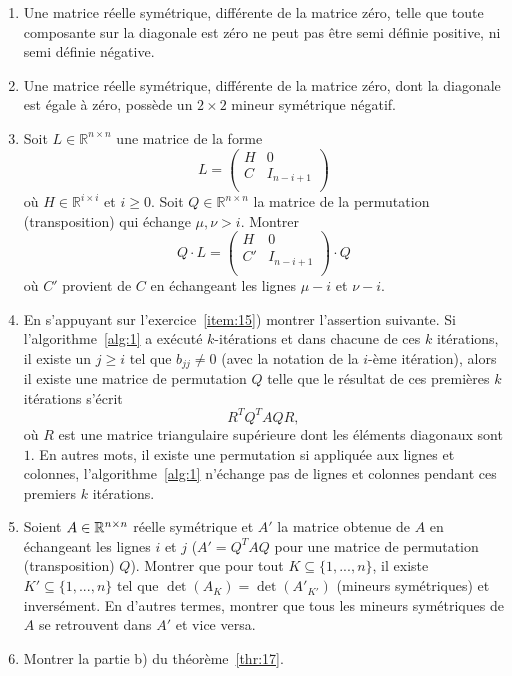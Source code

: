 \begin{enumerate}
\item Une matrice réelle  symétrique, différente de la matrice zéro, telle que toute composante sur la diagonale est zéro ne peut pas être semi définie positive, ni semi définie négative. 
\item Une matrice réelle symétrique, différente de la matrice zéro, dont la diagonale est égale à zéro, possède un $2 ×2$ mineur symétrique négatif. \label{item:17}
\item Soit $L \in ℝ^{n × n}$ une matrice %
de la forme 
  \begin{displaymath}
L = \left(\begin{array}{c|c}
H & 0  \\
\hline
C  & I_{n-i+1} \\
\end{array}\right)
\end{displaymath}
où  $H ∈ ℝ^{i×i}$ et $i ≥0$. Soit $Q ∈ ℝ^{n ×n}$ la matrice de la permutation (transposition)  qui échange $μ, ν > i$. Montrer 
\begin{displaymath}
  Q \cdot L = \left(\begin{array}{c|c}
H & 0  \\
\hline
C'  & I_{n-i+1} \\
\end{array}\right) \cdot Q
\end{displaymath}
où $C'$ provient de $C$ en échangeant les lignes $μ-i$ et $ν-i$. 
\label{item:15}
\item \label{item:16}
En s'appuyant sur l'exercice~\ref{item:15}) montrer l'assertion suivante. Si l'algorithme~\ref{alg:1} a exécuté $k$-itérations et dans chacune de ces $k$ itérations, il existe un $j ≥i$ tel que  $b_{jj} \neq 0$ (avec la notation de la $i$-ème itération), alors il existe une matrice de permutation $Q$ telle que le résultat de ces premières $k$ itérations s'écrit 
\begin{displaymath}
  R^T Q^T A Q R, 
\end{displaymath}
où $R$ est une matrice triangulaire supérieure dont les éléments diagonaux sont $1$.  En autres mots, il existe une permutation si appliquée aux lignes et colonnes, l'algorithme~\ref{alg:1} n'échange pas de lignes et colonnes pendant ces premiers $k$ itérations. 
\item Soient $A \in \Bbb R^{n \times n}$ réelle symétrique et $A'$ la matrice obtenue de $A$ en échangeant les lignes $i$ et $j$ ($A' = Q^T A Q$ pour une matrice de permutation (transposition) $Q$). Montrer que pour tout $K \subseteq \{1, ..., n\}$, il existe $K' \subseteq \{1, ..., n\}$ tel que $\det(A_K) = \det(A'_{K'})$ (mineurs symétriques) et inversément. En d'autres termes, montrer que tous les mineurs symétriques de $A$ se retrouvent dans $A'$ et vice versa.
\item Montrer la partie b) du théorème~\ref{thr:17}. 


\end{enumerate}
